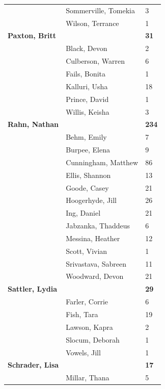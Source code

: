 \documentclass{article}\usepackage[]{graphicx}\usepackage[]{color}
\begin{document}
{\begin{longtable} { >{\raggedright}p{}|p{}p{}}
   & Sommerville, Tomekia & 3 \\ 
   & Wilson, Terrance & 1 \\ 
  \textbf{Paxton, Britt} &  & \hspace{2cm}\textbf{31} \\ 
   \rowcolor[gray]{0.90} & Black, Devon & 2 \\ 
   \rowcolor[gray]{0.90} & Culberson, Warren & 6 \\ 
   \rowcolor[gray]{0.90} & Fails, Bonita & 1 \\ 
   & Kalluri, Usha & 18 \\ 
   & Prince, David & 1 \\ 
   & Willis, Keisha & 3 \\ 
   \rowcolor[gray]{0.90}\textbf{Rahn, Nathan} &  & \hspace{2cm}\textbf{234} \\ 
   \rowcolor[gray]{0.90} & Behm, Emily & 7 \\ 
   \rowcolor[gray]{0.90} & Burpee, Elena & 9 \\ 
   & Cunningham, Matthew & 86 \\ 
   & Ellis, Shannon & 13 \\ 
   & Goode, Casey & 21 \\ 
   \rowcolor[gray]{0.90} & Hoogerhyde, Jill & 26 \\ 
   \rowcolor[gray]{0.90} & Ing, Daniel & 21 \\ 
   \rowcolor[gray]{0.90} & Jabzanka, Thaddeus & 6 \\ 
   & Messina, Heather & 12 \\ 
   & Scott, Vivian & 1 \\ 
   & Srivastava, Sabreen & 11 \\ 
   \rowcolor[gray]{0.90} & Woodward, Devon & 21 \\ 
   \rowcolor[gray]{0.90}\textbf{Sattler, Lydia} &  & \hspace{2cm}\textbf{29} \\ 
   \rowcolor[gray]{0.90} & Farler, Corrie & 6 \\ 
   & Fish, Tara & 19 \\ 
   & Lawson, Kapra & 2 \\ 
   & Slocum, Deborah & 1 \\ 
   \rowcolor[gray]{0.90} & Vowels, Jill & 1 \\ 
   \rowcolor[gray]{0.90}\textbf{Schrader, Lisa} &  & \hspace{2cm}\textbf{17} \\ 
   \rowcolor[gray]{0.90} & Millar, Thana & 5 \\ 

\end{longtable}}
\end{document}
